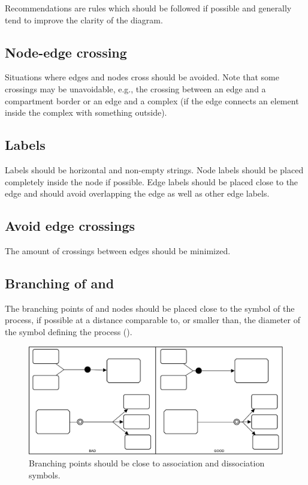 Recommendations are rules which should be followed if possible and generally tend to improve the clarity of the diagram.

\subsection{Node-edge crossing}
\label{sec:crosEdNo}

Situations where edges and nodes cross should be avoided. Note that some crossings may be unavoidable, e.g., the crossing between an edge and a compartment border or an edge and a complex (if the edge connects an element inside the complex with something outside).

\subsection{Labels}
\label{sec:labels}

Labels should be horizontal and non-empty strings. Node labels should be placed completely
inside the node if possible. Edge labels should be placed close to the edge and should avoid overlapping the edge as well as other edge
labels.

\subsection{Avoid edge crossings}

The amount of crossings between edges should be minimized.

\subsection{Branching of  and }

The branching points of  and  nodes should be placed close to the symbol of the process, if possible at a distance comparable to, or smaller than, the diameter of the symbol defining the process ().

\begin{figure}[htb]
  \centering
  \includegraphics[scale=0.5]{images/build/layout_branching.pdf}
  \caption{Branching points should be close to association and dissociation symbols.}\label{fig:branching}
\end{figure}

